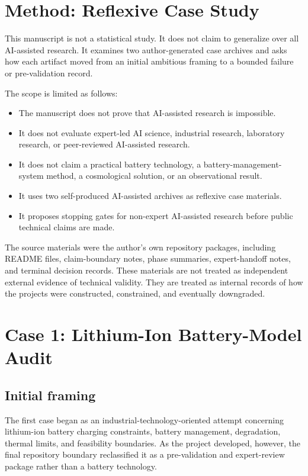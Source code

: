 \documentclass[a4paper,11pt]{article}
\begin{document}
\section{Method: Reflexive Case Study}

This manuscript is not a statistical study. It does not claim to generalize over all AI-assisted research. It examines two author-generated case archives and asks how each artifact moved from an initial ambitious framing to a bounded failure or pre-validation record.

The scope is limited as follows:

\begin{itemize}[leftmargin=2em]
  \item The manuscript does not prove that AI-assisted research is impossible.
  \item It does not evaluate expert-led AI science, industrial research, laboratory research, or peer-reviewed AI-assisted research.
  \item It does not claim a practical battery technology, a battery-management-system method, a cosmological solution, or an observational result.
  \item It uses two self-produced AI-assisted archives as reflexive case materials.
  \item It proposes stopping gates for non-expert AI-assisted research before public technical claims are made.
\end{itemize}

The source materials were the author's own repository packages, including README files, claim-boundary notes, phase summaries, expert-handoff notes, and terminal decision records. These materials are not treated as independent external evidence of technical validity. They are treated as internal records of how the projects were constructed, constrained, and eventually downgraded.

\section{Case 1: Lithium-Ion Battery-Model Audit}

\subsection{Initial framing}

The first case began as an industrial-technology-oriented attempt concerning lithium-ion battery charging constraints, battery management, degradation, thermal limits, and feasibility boundaries. As the project developed, however, the final repository boundary reclassified it as a pre-validation and expert-review package rather than a battery technology.
\end{document}
